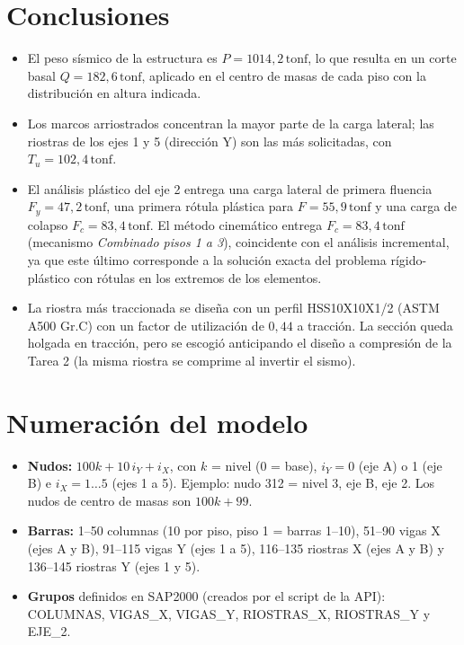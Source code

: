 \documentclass[11pt,letterpaper]{article}
\newcommand{\tonf}{\,\mathrm{tonf}}
\begin{document}
\section{Conclusiones}
\begin{itemize}
  \item El peso sísmico de la estructura es $P = 1014{,}2\tonf$, lo que resulta en un corte
        basal $Q = 182{,}6\tonf$, aplicado en el centro de masas de cada piso con la distribución
        en altura indicada.
  \item Los marcos arriostrados concentran la mayor parte de la carga lateral; las riostras de los ejes 1 y 5
        (dirección Y) son las más solicitadas, con $T_u = 102{,}4\tonf$.
  \item El análisis plástico del eje 2 entrega una carga lateral de primera fluencia
        $F_y = 47{,}2\tonf$, una primera rótula plástica para $F = 55{,}9\tonf$ y
        una carga de colapso $F_c = 83{,}4\tonf$. El método cinemático entrega
        $F_c = 83{,}4\tonf$ (mecanismo \emph{Combinado pisos 1 a 3}), coincidente con el
        análisis incremental, ya que este último corresponde a la solución exacta del problema rígido-plástico
        con rótulas en los extremos de los elementos.
  \item La riostra más traccionada se diseña con un perfil HSS10X10X1/2 (ASTM A500 Gr.C) con un factor de utilización
        de $0{,}44$ a tracción. La sección queda holgada en tracción, pero se escogió anticipando el
        diseño a compresión de la Tarea 2 (la misma riostra se comprime al invertir el sismo).
\end{itemize}

\appendix
\section{Numeración del modelo}\label{anx:num}
\begin{itemize}
  \item \textbf{Nudos:} $100k + 10\,i_Y + i_X$, con $k$ = nivel (0 = base), $i_Y = 0$ (eje A) o 1 (eje B) e
        $i_X = 1 \dots 5$ (ejes 1 a 5). Ejemplo: nudo 312 = nivel 3, eje B, eje 2. Los nudos de centro de masas
        son $100k + 99$.
  \item \textbf{Barras:} 1--50 columnas (10 por piso, piso 1 = barras 1--10), 51--90 vigas X (ejes A y B),
        91--115 vigas Y (ejes 1 a 5), 116--135 riostras X (ejes A y B) y 136--145 riostras Y (ejes 1 y 5).
  \item \textbf{Grupos} definidos en SAP2000 (creados por el script de la API): COLUMNAS, VIGAS\_X, VIGAS\_Y, RIOSTRAS\_X, RIOSTRAS\_Y y EJE\_2.
\end{itemize}
\end{document}
